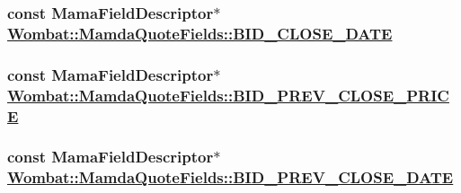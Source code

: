 \hypertarget{classWombat_1_1MamdaQuoteFields_be28e6e22f05504030522ea83a3837f5}{
\subsubsection[BID\_\-CLOSE\_\-DATE]{\setlength{\rightskip}{0pt plus 5cm}const Mama\-Field\-Descriptor$\ast$ \hyperlink{classWombat_1_1MamdaQuoteFields_be28e6e22f05504030522ea83a3837f5}{Wombat::Mamda\-Quote\-Fields::BID\_\-CLOSE\_\-DATE}}}
\label{classWombat_1_1MamdaQuoteFields_be28e6e22f05504030522ea83a3837f5}


\hypertarget{classWombat_1_1MamdaQuoteFields_402a4e1e20711c496fc68e1a35acd615}{
\subsubsection[BID\_\-PREV\_\-CLOSE\_\-PRICE]{\setlength{\rightskip}{0pt plus 5cm}const Mama\-Field\-Descriptor$\ast$ \hyperlink{classWombat_1_1MamdaQuoteFields_402a4e1e20711c496fc68e1a35acd615}{Wombat::Mamda\-Quote\-Fields::BID\_\-PREV\_\-CLOSE\_\-PRICE}}}
\label{classWombat_1_1MamdaQuoteFields_402a4e1e20711c496fc68e1a35acd615}


\hypertarget{classWombat_1_1MamdaQuoteFields_66f8b6097944654cc64fbbac4e41eb46}{
\subsubsection[BID\_\-PREV\_\-CLOSE\_\-DATE]{\setlength{\rightskip}{0pt plus 5cm}const Mama\-Field\-Descriptor$\ast$ \hyperlink{classWombat_1_1MamdaQuoteFields_66f8b6097944654cc64fbbac4e41eb46}{Wombat::Mamda\-Quote\-Fields::BID\_\-PREV\_\-CLOSE\_\-DATE}}}
\label{classWombat_1_1MamdaQuoteFields_66f8b6097944654cc64fbbac4e41eb46}



